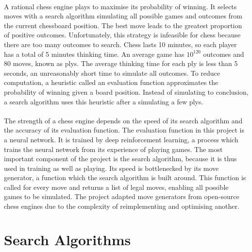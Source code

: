 \documentclass[12pt,a4paper]{book}
\begin{document}
\paragraph{} A rational chess engine plays to maximise its probability of winning. It selects moves with a search algorithm simulating all possible games and outcomes from the current chessboard position. The best move leads to the greatest proportion of positive outcomes. Unfortunately, this strategy is infeasible for chess because there are too many outcomes to search. Chess lasts 10 minutes, so each player has a total of 5 minutes thinking time. An average game has $10 ^{120}$ outcomes and 80 moves, known as plys. The average thinking time for each ply is less than 5 seconds, an unreasonably short time to simulate all outcomes. To reduce computation, a heuristic called an evaluation function approximates the probability of winning given a board position. Instead of simulating to conclusion, a search algorithm uses this heuristic after a simulating a few plys.

\paragraph{} The strength of a chess engine depends on the speed of its search algorithm and the accuracy of its evaluation function. The evaluation function in this project is a neural network. It is trained by deep reinforcement learning, a process which trains the neural network from its experience of playing games. The most important component of the project is the search algorithm, because it is thus used in training as well as playing. Its speed is bottlenecked by its move generator, a function which the search algorithm is built around. This function is called for every move and returns a list of legal moves, enabling all possible games to be simulated. The project adapted move generators from open-source chess engines due to the complexity of reimplementing and optimising another.

\section{Search Algorithms}
\end{document}
